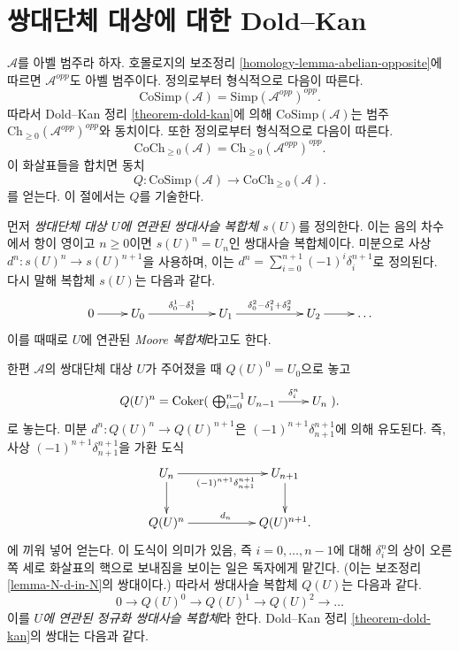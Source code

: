 \section{쌍대단체 대상에 대한 Dold--Kan}
\label{section-dold-kan-cosimplicial}

\noindent
$\mathcal{A}$를 아벨 범주라 하자. 호몰로지의 보조정리
\ref{homology-lemma-abelian-opposite}에 따르면 $\mathcal{A}^{opp}$도
아벨 범주이다. 정의로부터 형식적으로 다음이 따른다.
$$
\text{CoSimp}(\mathcal{A}) = \text{Simp}(\mathcal{A}^{opp})^{opp}.
$$
따라서 Dold--Kan 정리 \ref{theorem-dold-kan}에 의해
$\text{CoSimp}(\mathcal{A})$는 범주
$\text{Ch}_{\geq 0}(\mathcal{A}^{opp})^{opp}$와 동치이다. 또한 정의로부터
형식적으로 다음이 따른다.
$$
\text{CoCh}_{\geq 0}(\mathcal{A}) =
\text{Ch}_{\geq 0}(\mathcal{A}^{opp})^{opp}.
$$
이 화살표들을 합치면 동치
$$
Q :
\text{CoSimp}(\mathcal{A})
\longrightarrow
\text{CoCh}_{\geq 0}(\mathcal{A}).
$$
를 얻는다. 이 절에서는 $Q$를 기술한다.

\medskip\noindent
먼저 {\it 쌍대단체 대상 $U$에 연관된 쌍대사슬 복합체 $s(U)$}를
정의한다. 이는 음의 차수에서 항이 영이고 $n \geq 0$이면
$s(U)^n = U_n$인 쌍대사슬 복합체이다. 미분으로 사상
$d^n : s(U)^n \to s(U)^{n + 1}$을 사용하며, 이는
$d^n = \sum_{i = 0}^{n + 1} (-1)^i \delta^{n + 1}_i$로 정의된다.
다시 말해 복합체 $s(U)$는 다음과 같다.
$$
\xymatrix{
0 \ar[r] &
U_0 \ar[rr]^{\delta^1_0 - \delta^1_1} & &
U_1 \ar[rr]^{\delta^2_0 - \delta^2_1 + \delta^2_2} & &
U_2 \ar[r] &
\ldots
}
$$
이를 때때로 $U$에 연관된 {\it Moore 복합체}라고도 한다.

\medskip\noindent
한편 $\mathcal{A}$의 쌍대단체 대상 $U$가 주어졌을 때
$Q(U)^0 = U_0$으로 놓고
$$
Q(U)^n = \Coker(
\xymatrix{
\bigoplus_{i = 0}^{n - 1} U_{n - 1} \ar[r]^-{\delta^n_i} &
U_n
}).
$$
로 놓는다. 미분 $d^n : Q(U)^n \to Q(U)^{n + 1}$은
$(-1)^{n + 1}\delta^{n + 1}_{n + 1}$에 의해 유도된다. 즉, 사상
$(-1)^{n + 1}\delta^{n + 1}_{n + 1}$을 가환 도식
$$
\xymatrix{
U_n \ar[rr]_{(-1)^{n + 1}\delta^{n + 1}_{n + 1}} \ar[d] & &
U_{n + 1} \ar[d] \\
Q(U)^n \ar[rr]^{d_n} & &
Q(U)^{n + 1}.
}
$$
에 끼워 넣어 얻는다. 이 도식이 의미가 있음, 즉
$i = 0, \ldots, n - 1$에 대해 $\delta^n_i$의 상이 오른쪽 세로 화살표의
핵으로 보내짐을 보이는 일은 독자에게 맡긴다. (이는 보조정리
\ref{lemma-N-d-in-N}의 쌍대이다.) 따라서 쌍대사슬 복합체 $Q(U)$는
다음과 같다.
$$
0 \to Q(U)^0 \to Q(U)^1 \to Q(U)^2 \to \ldots
$$
이를 {\it $U$에 연관된 정규화 쌍대사슬 복합체}라 한다.
Dold--Kan 정리 \ref{theorem-dold-kan}의 쌍대는 다음과 같다.

